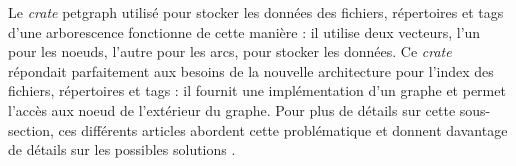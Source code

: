 \bigbreak
Le \textit{crate} petgraph utilisé pour stocker les données des fichiers, répertoires et tags d'une 
arborescence fonctionne de cette manière : il utilise deux vecteurs, l'un pour les noeuds, l'autre 
pour les arcs, pour stocker les données. Ce \textit{crate} répondait parfaitement aux besoins de 
la nouvelle architecture pour l'index des fichiers, répertoires et tags : il fournit une implémentation 
d'un graphe et permet l'accès aux noeud de l'extérieur du graphe.
Pour plus de détails sur cette sous-section, ces différents articles abordent cette problématique 
et donnent davantage de détails sur les possibles solutions \cite{ref2} \cite{ref26} \cite{ref49} 
\cite{ref46} \cite{ref47} \cite{ref48}.

